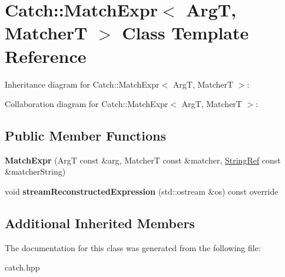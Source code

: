 \hypertarget{classCatch_1_1MatchExpr}{}\section{Catch\+:\+:Match\+Expr$<$ ArgT, MatcherT $>$ Class Template Reference}
\label{classCatch_1_1MatchExpr}


Inheritance diagram for Catch\+:\+:Match\+Expr$<$ ArgT, MatcherT $>$\+:


Collaboration diagram for Catch\+:\+:Match\+Expr$<$ ArgT, MatcherT $>$\+:
\subsection*{Public Member Functions}
\begin{DoxyCompactItemize}
\item 
{\bfseries Match\+Expr} (ArgT const \&arg, MatcherT const \&matcher, \hyperlink{classCatch_1_1StringRef}{String\+Ref} const \&matcher\+String)\hypertarget{classCatch_1_1MatchExpr_ae55ee9bf46c8676c65e9df291a98c345}{}\label{classCatch_1_1MatchExpr_ae55ee9bf46c8676c65e9df291a98c345}

\item 
void {\bfseries stream\+Reconstructed\+Expression} (std\+::ostream \&os) const override\hypertarget{classCatch_1_1MatchExpr_ad3e41adb597750b2219bb37e51185629}{}\label{classCatch_1_1MatchExpr_ad3e41adb597750b2219bb37e51185629}

\end{DoxyCompactItemize}
\subsection*{Additional Inherited Members}


The documentation for this class was generated from the following file\+:\begin{DoxyCompactItemize}
\item 
catch.\+hpp\end{DoxyCompactItemize}
